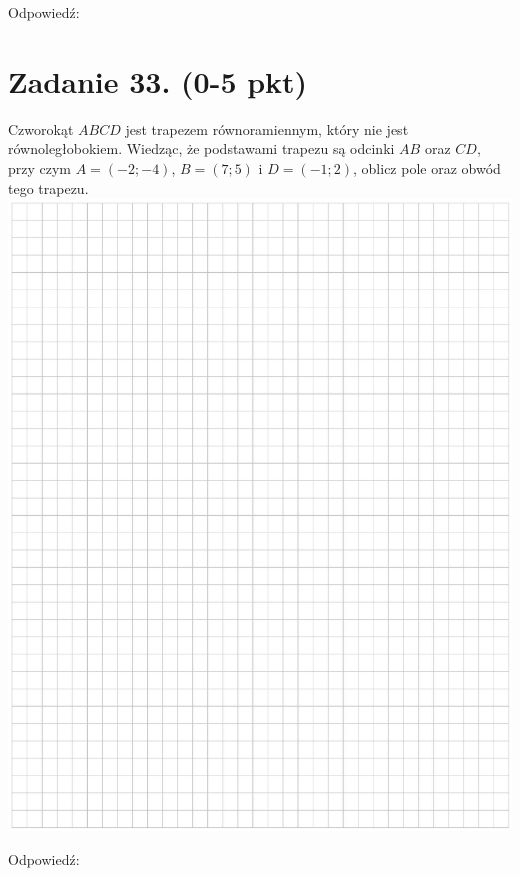 \documentclass[10pt]{article}
\begin{document}
Odpowiedź:

\section*{Zadanie 33. (0-5 pkt)}
Czworokąt \(A B C D\) jest trapezem równoramiennym, który nie jest równoległobokiem. Wiedząc, że podstawami trapezu są odcinki \(A B\) oraz \(C D\), przy czym \(A=(-2 ;-4)\), \(B=(7 ; 5)\) i \(D=(-1 ; 2)\), oblicz pole oraz obwód tego trapezu.\\
\includegraphics[max width=\textwidth, center]{2024_11_21_b8ac5f500a5bbb1b4ec5g-16}

Odpowiedź:
\end{document}

